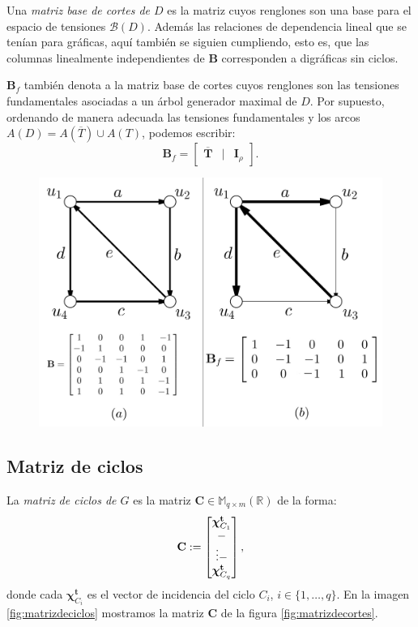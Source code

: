 Una \textit{matriz base de cortes de $D$} es la matriz cuyos renglones son una base para el espacio de tensiones $\mathcal{B}(D)$. Además las relaciones de dependencia lineal que se tenían para gráficas, aquí también se siguien cumpliendo, esto es, que las columnas linealmente independientes de $\mathbf{B}$ corresponden a digráficas sin ciclos.

$\mathbf{B}_{f}$ también denota a la matriz base de cortes cuyos renglones son las tensiones fundamentales asociadas a un árbol generador maximal de $D$. Por supuesto, ordenando de manera adecuada las tensiones fundamentales y los arcos $A(D) = A(\overline{T}) \cup A(T)$, podemos escribir:
$$
\mathbf{B}_{f} = \begin{bmatrix}
\mathbf{\overline{T}}& | & \mathbf{I}_{\rho}
\end{bmatrix}.
$$

\begin{figure}[h]
    \centering
    \includegraphics[scale=0.25]{img/imgchapter4/matrizdecortesdirigidos.jpg}
    \caption{}
    \label{fig:matrizdecortesdirigidos}
\end{figure}

\subsection{Matriz de ciclos}

La \textit{matriz de ciclos de $G$} es la matriz $\mathbf{C} \in \mathbb{M}_{q \times m}(\mathbb{R})$ de la forma: $$\mathbf{C}:= \begin{bmatrix} 
\boldsymbol{\chi}_{C_{1}}^{\mathbf{t}} \\
\-- \\
\vdots
\-- \\
\boldsymbol{\chi}_{C_{q}}^{\mathbf{t}}
\end{bmatrix},
$$ 
donde cada $\boldsymbol{\chi}_{C_{i}}^{\mathbf{t}}$ es el vector de incidencia del ciclo $C_{i}$, $i \in \{1,\ldots, q\}$. En la imagen \ref{fig:matrizdeciclos} mostramos la matriz $\mathbf{C}$ de la figura \ref{fig:matrizdecortes}.

